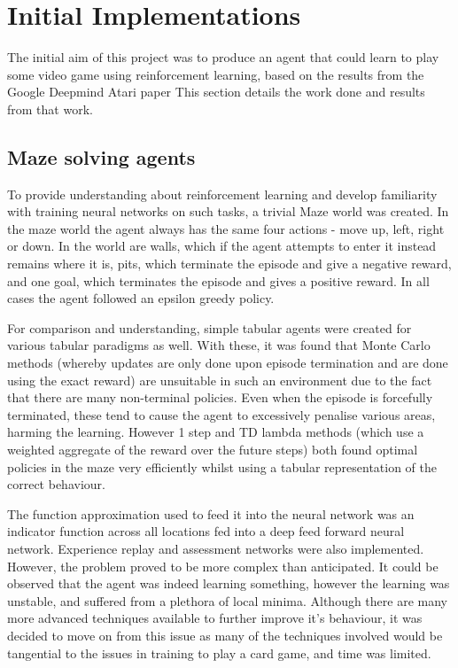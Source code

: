 \section{Initial Implementations}
The initial aim of this project was to produce an agent that could learn to play some video game using reinforcement learning, based on the results from the Google Deepmind Atari paper \cite{atariDQN} %
This section details the work done and results from that work.
\subsection{Maze solving agents}
To provide understanding about reinforcement learning and develop familiarity with training neural networks on such tasks, a trivial Maze world was created. In the maze world the agent always has the same four actions - move up, left, right or down. In the world are walls, which if the agent attempts to enter it instead remains where it is, pits, which terminate the episode and give a negative reward, and one goal, which terminates the episode and gives a positive reward.
In all cases the agent followed an epsilon greedy policy. %

For comparison and understanding, simple tabular agents were created for various tabular paradigms as well. With these, it was found that Monte Carlo methods (whereby updates are only done upon episode termination and are done using the exact reward) are unsuitable in such an environment due to the fact that there are many non-terminal policies. Even when the episode is forcefully terminated, these tend to cause the agent to excessively penalise various areas, harming the learning. However 1 step and TD lambda methods (which use a weighted aggregate of the reward over the future steps) both found optimal policies in the maze very efficiently whilst using a tabular representation of the correct behaviour.

The function approximation used to feed it into the neural network was an indicator function across all locations fed into a deep feed forward neural network. Experience replay and assessment networks were also implemented. However, the problem proved to be more complex than anticipated. It could be observed that the agent was indeed learning something, however the learning was unstable, and suffered from a plethora of local minima. Although there are many more advanced techniques available to further improve it's behaviour, it was decided to move on from this issue as many of the techniques involved would be tangential to the issues in training to play a card game, and time was limited.